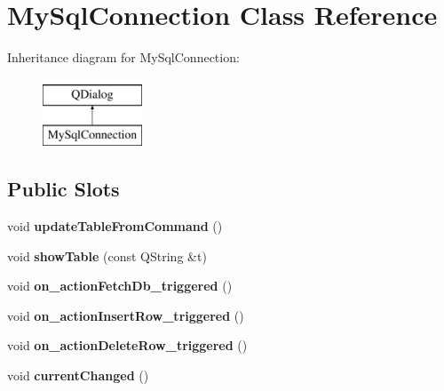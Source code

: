 \hypertarget{classMySqlConnection}{\section{My\-Sql\-Connection Class Reference}
\label{classMySqlConnection}
}
Inheritance diagram for My\-Sql\-Connection\-:\begin{figure}[H]
\begin{center}
\leavevmode
\includegraphics[height=2.000000cm]{classMySqlConnection}
\end{center}
\end{figure}
\subsection*{Public Slots}
\begin{DoxyCompactItemize}
\item 
\hypertarget{classMySqlConnection_a54100a74b452c93df765a0a5f3c15a48}{void {\bfseries update\-Table\-From\-Command} ()}\label{classMySqlConnection_a54100a74b452c93df765a0a5f3c15a48}

\item 
\hypertarget{classMySqlConnection_a5292e25e9165b6f404ddd61f47ee0fed}{void {\bfseries show\-Table} (const Q\-String \&t)}\label{classMySqlConnection_a5292e25e9165b6f404ddd61f47ee0fed}

\item 
\hypertarget{classMySqlConnection_ae9cd7ee42ea043678c256b29edf4e47b}{void {\bfseries on\-\_\-action\-Fetch\-Db\-\_\-triggered} ()}\label{classMySqlConnection_ae9cd7ee42ea043678c256b29edf4e47b}

\item 
\hypertarget{classMySqlConnection_a2ed0c4c3b6a01da65d840299107dbbb5}{void {\bfseries on\-\_\-action\-Insert\-Row\-\_\-triggered} ()}\label{classMySqlConnection_a2ed0c4c3b6a01da65d840299107dbbb5}

\item 
\hypertarget{classMySqlConnection_aad4af399b4f307513a260b6be18028ab}{void {\bfseries on\-\_\-action\-Delete\-Row\-\_\-triggered} ()}\label{classMySqlConnection_aad4af399b4f307513a260b6be18028ab}

\item 
\hypertarget{classMySqlConnection_ab7226843a174d0968639ccc0f57eb9a9}{void {\bfseries current\-Changed} ()}\label{classMySqlConnection_ab7226843a174d0968639ccc0f57eb9a9}

\end{DoxyCompactItemize}

